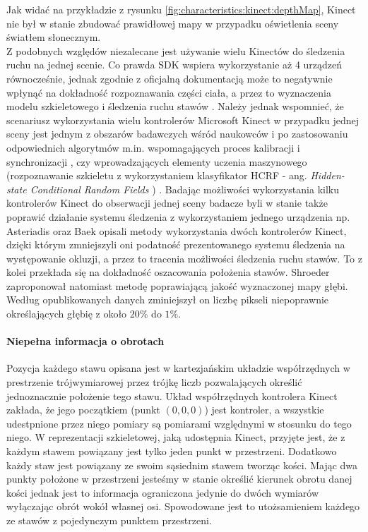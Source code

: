 Jak widać na przykładzie z rysunku \ref{fig:characteristics:kinect:depthMap}, Kinect nie był w stanie zbudować prawidłowej mapy w przypadku oświetlenia sceny światłem słonecznym. \\
Z podobnych względów niezalecane jest używanie wielu Kinectów do śledzenia ruchu na jednej scenie. Co prawda SDK wspiera wykorzystanie aż 4 urządzeń równocześnie, jednak zgodnie z oficjalną dokumentacją może to negatywnie wpłynąć na dokładność rozpoznawania części ciała, a przez to wyznaczenia modelu szkieletowego i śledzenia ruchu stawów \cite{msdn:multipleKinectsSDK2016}. Należy jednak wspomnieć, że scenariusz wykorzystania wielu kontrolerów Microsoft Kinect w przypadku jednej sceny jest jednym z obszarów badawczych wśród naukowców i po zastosowaniu odpowiednich algorytmów m.in.  wspomagających proces kalibracji i synchronizacji \cite{Kohno2013}, czy wprowadzających elementy uczenia maszynowego (rozpoznawanie szkieletu z wykorzystaniem klasyfikator HCRF - ang. \emph{Hidden-state Conditional Random Fields }) \cite{Kitsikidis2011}. Badając możliwości wykorzystania kilku kontrolerów Kinect do obserwacji jednej sceny badacze byli w stanie także poprawić działanie systemu śledzenia z wykorzystaniem jednego urządzenia np. Asteriadis \cite{Asteriadis2013} oraz Baek \cite{Baek2014} opisali metody wykorzystania dwóch kontrolerów Kinect, dzięki którym zmniejszyli oni podatność prezentowanego systemu śledzenia na występowanie okluzji, a przez to tracenia możliwości śledzenia ruchu stawów. To z kolei przekłada się na dokładność oszacowania położenia stawów. Shroeder \cite{Schroder2011} zaproponował natomiast metodę poprawiającą jakość wyznaczonej mapy głębi. Według opublikowanych danych zminiejszył on liczbę pikseli niepoprawnie określających głębię z około $20\%$ do $1\%$.
		
\paragraph*{Niepełna informacja o obrotach}
Pozycja każdego stawu opisana jest w kartezjańskim układzie współrzędnych w prestrzenie trójwymiarowej przez trójkę liczb pozwalających określić jednoznacznie położenie tego stawu. Układ współrzędnych kontrolera Kinect zakłada, że jego początkiem (punkt $(0, 0, 0)$) jest kontroler, a wszystkie udestpnione przez niego pomiary są pomiarami względnymi w stosunku do tego niego. W reprezentacji szkieletowej, jaką udostępnia Kinect, przyjęte jest, że z każdym stawem powiązany jest tylko jeden punkt w przestrzeni. Dodatkowo każdy staw jest powiązany ze swoim sąsiednim stawem tworząc kości. Mając dwa punkty położone w przestrzeni jesteśmy w stanie określić kierunek obrotu danej kości jednak jest to informacja ograniczona jedynie do dwóch wymiarów wyłączając obrót wokół własnej osi. Spowodowane jest to utożsamieniem każdego ze stawów z pojedynczym punktem przestrzeni.
		
